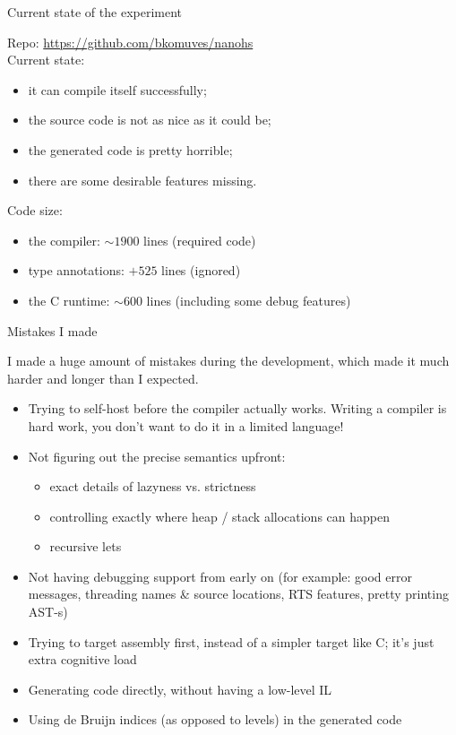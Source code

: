 \documentclass{beamer}
\begin{document}

\begin{frame}{Current state of the experiment}

Repo: \url{https://github.com/bkomuves/nanohs}\\[15pt]

Current state:
\begin{itemize}
\item it can compile itself successfully;
\item the source code is not as nice as it could be;
\item the generated code is pretty horrible;
\item there are some desirable features missing.\\[15pt]
\end{itemize}

Code size:
\begin{itemize}
\item the compiler: $\sim 1900$ lines (required code)
\item type annotations: $+525$ lines (ignored)
\item the C runtime: $\sim 600$ lines (including some debug features)
\end{itemize}

\end{frame}


\begin{frame}{Mistakes I made}

{\small
I made a huge amount of mistakes during the development, which made it much
harder and longer than I expected.

\begin{itemize}
\item Trying to self-host before the compiler actually works. Writing a 
compiler is hard work, you don't want to do it in a limited language!
\item Not figuring out the precise semantics upfront:
   \begin{itemize}
   \item exact details of lazyness vs. strictness
   \item controlling exactly where heap / stack allocations can happen
   \item recursive lets 
   \end{itemize}
\item Not having debugging support from early on (for example: good error messages, 
      threading names \& source locations, RTS features, pretty printing AST-s)
\item Trying to target assembly first, instead of a simpler target like C; it's just extra cognitive load
\item Generating code directly, without having a low-level IL
\item Using de Bruijn indices (as opposed to levels) in the generated code
\end{itemize}
}

\end{frame}
\end{document}
